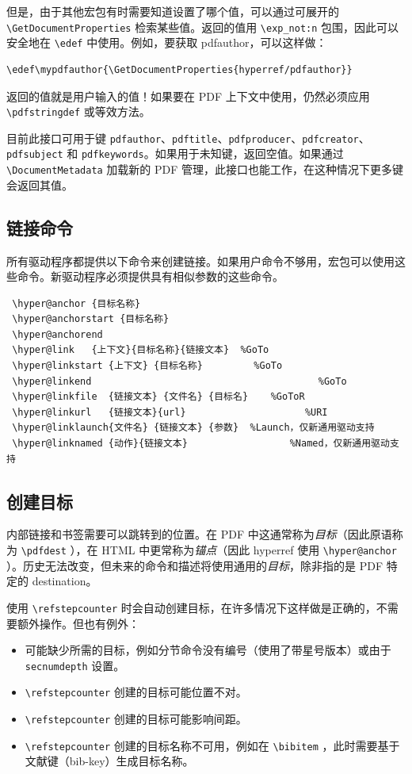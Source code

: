 \documentclass{article}
\newcommand*{\cs}[1]{%
  \texttt{\textbackslash #1}%
}
\newcommand*{\xpackage}[1]{\textsf{#1}}
\begin{document}
但是，由于其他宏包有时需要知道设置了哪个值，可以通过可展开的 \cs{GetDocumentProperties} 检索某些值。返回的值用 \cs{exp\_not:n} 包围，因此可以安全地在 \cs{edef} 中使用。例如，要获取 pdfauthor，可以这样做：

\begin{verbatim}
\edef\mypdfauthor{\GetDocumentProperties{hyperref/pdfauthor}}
\end{verbatim}

返回的值就是用户输入的值！如果要在 PDF 上下文中使用，仍然必须应用 \cs{pdfstringdef} 或等效方法。

目前此接口可用于键 \texttt{pdfauthor}、\texttt{pdftitle}、\texttt{pdfproducer}、\texttt{pdfcreator}、\texttt{pdfsubject} 和 \texttt{pdfkeywords}。如果用于未知键，返回空值。如果通过 \cs{DocumentMetadata} 加载新的 PDF 管理，此接口也能工作，在这种情况下更多键会返回其值。


\subsection{链接命令}

所有驱动程序都提供以下命令来创建链接。如果用户命令不够用，宏包可以使用这些命令。新驱动程序必须提供具有相似参数的这些命令。

\begin{verbatim}
 \hyper@anchor {目标名称}
 \hyper@anchorstart {目标名称}
 \hyper@anchorend
 \hyper@link   {上下文}{目标名称}{链接文本}  %GoTo
 \hyper@linkstart {上下文} {目标名称}         %GoTo
 \hyper@linkend                                        %GoTo
 \hyper@linkfile  {链接文本} {文件名} {目标名}    %GoToR
 \hyper@linkurl   {链接文本}{url}                     %URI
 \hyper@linklaunch{文件名} {链接文本} {参数}  %Launch，仅新通用驱动支持
 \hyper@linknamed {动作}{链接文本}                  %Named，仅新通用驱动支持
\end{verbatim}

\subsection{创建目标}

内部链接和书签需要可以跳转到的位置。在 PDF 中这通常称为\emph{目标}（因此原语称为 \cs{pdfdest}），在 HTML 中更常称为\emph{锚点}（因此 \xpackage{hyperref} 使用 \cs{hyper@anchor}）。历史无法改变，但未来的命令和描述将使用通用的\emph{目标}，除非指的是 PDF 特定的 destination。

使用 \cs{refstepcounter} 时会自动创建目标，在许多情况下这样做是正确的，不需要额外操作。但也有例外：
\begin{itemize}
\item 可能缺少所需的目标，例如分节命令没有编号（使用了带星号版本）或由于 \texttt{secnumdepth} 设置。
\item \cs{refstepcounter} 创建的目标可能位置不对。
\item \cs{refstepcounter} 创建的目标可能影响间距。
\item \cs{refstepcounter} 创建的目标名称不可用，例如在
\cs{bibitem}，此时需要基于文献键（bib-key）生成目标名称。
\end{itemize}
\end{document}
